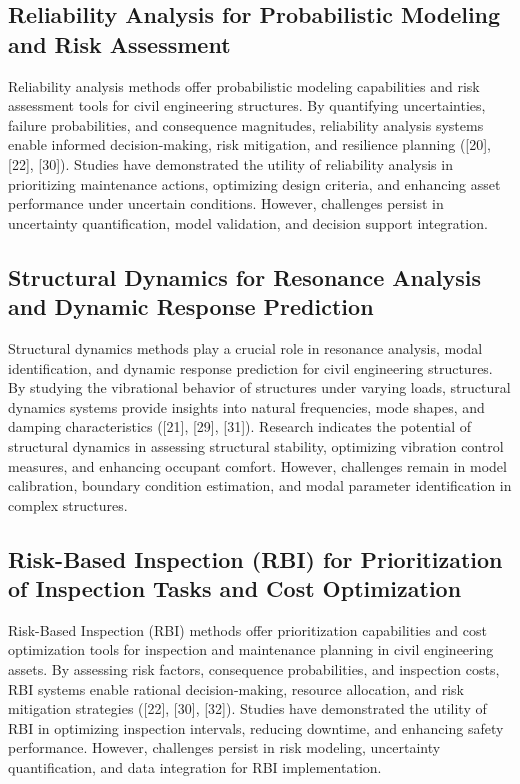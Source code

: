 \documentclass[journal, a4paper]{IEEEtran}
\begin{document}
\subsection{Reliability Analysis for Probabilistic Modeling and Risk Assessment}
Reliability analysis methods offer probabilistic modeling capabilities and risk assessment tools for civil engineering structures.
By quantifying uncertainties, failure probabilities, and consequence magnitudes, reliability analysis
systems enable informed decision-making, risk mitigation, and resilience planning ([20], [22], [30]).
Studies have demonstrated the utility of reliability analysis in prioritizing maintenance actions,
optimizing design criteria, and enhancing asset performance under uncertain conditions.
However, challenges persist in uncertainty quantification, model validation, and decision support integration.

\subsection{Structural Dynamics for Resonance Analysis and Dynamic Response Prediction}
Structural dynamics methods play a crucial role in resonance analysis, modal identification, and dynamic
response prediction for civil engineering structures. By studying the vibrational behavior of structures under
varying loads, structural dynamics systems provide insights into natural frequencies, mode shapes, and damping
characteristics ([21], [29], [31]). Research indicates the potential of structural dynamics in assessing structural
stability, optimizing vibration control measures, and enhancing occupant comfort. However, challenges remain in model
calibration, boundary condition estimation, and modal parameter identification in complex structures.

\subsection{Risk-Based Inspection (RBI) for Prioritization of Inspection Tasks and Cost Optimization}
Risk-Based Inspection (RBI) methods offer prioritization capabilities and cost optimization tools for inspection
and maintenance planning in civil engineering assets. By assessing risk factors, consequence probabilities,
and inspection costs, RBI systems enable rational decision-making, resource allocation, and risk mitigation
strategies ([22], [30], [32]). Studies have demonstrated the utility of RBI in optimizing inspection intervals,
reducing downtime, and enhancing safety performance. However, challenges persist in risk modeling, uncertainty quantification,
and data integration for RBI implementation.
\end{document}
